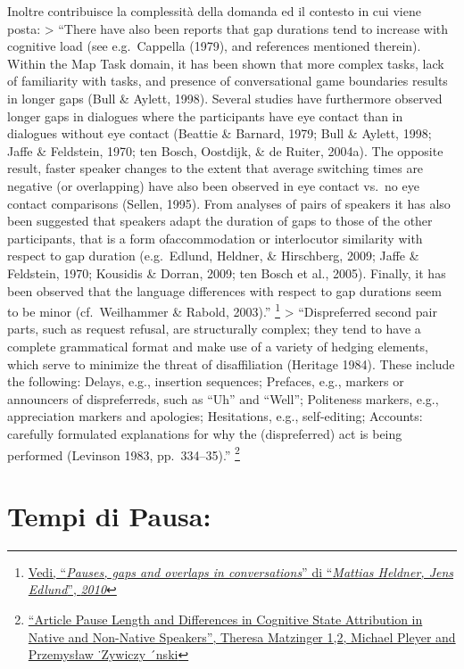 \documentclass[
]{article}
\begin{document}
Inoltre contribuisce la complessità della domanda ed il contesto in cui viene posta: \textgreater{} ``There have also been reports that gap durations tend to increase with cognitive load (see e.g.~Cappella (1979), and references mentioned therein). Within the Map Task domain, it has been shown that more complex tasks, lack of familiarity with tasks, and presence of conversational game boundaries results in longer gaps (Bull \& Aylett, 1998). Several studies have furthermore observed longer gaps in dialogues where the participants have eye contact than in dialogues without eye contact (Beattie \& Barnard, 1979; Bull \& Aylett, 1998; Jaffe \& Feldstein, 1970; ten Bosch, Oostdijk, \& de Ruiter, 2004a). The opposite result, faster speaker changes to the extent that average switching times are negative (or overlapping) have also been observed in eye contact vs.~no eye contact comparisons (Sellen, 1995). From analyses of pairs of speakers it has also been suggested that speakers adapt the duration of gaps to those of the other participants, that is a form ofaccommodation or interlocutor similarity with respect to gap duration (e.g.~Edlund, Heldner, \& Hirschberg, 2009; Jaffe \& Feldstein, 1970; Kousidis \& Dorran, 2009; ten Bosch et al., 2005). Finally, it has been observed that the language differences with respect to gap durations seem to be minor (cf.~Weilhammer \& Rabold, 2003).'' \footnote{\href{DOC/1-s2.0-S0095447010000628-main.pdf}{Vedi, ``\emph{Pauses, gaps and overlaps in conversations}'' di ``\emph{Mattias Heldner, Jens Edlund}'', \emph{2010}}} \textgreater{} ``Dispreferred second pair parts, such as request refusal, are structurally complex; they tend to have a complete grammatical format and make use of a variety of hedging elements, which serve to minimize the threat of disaffiliation (Heritage 1984). These include the following: Delays, e.g., insertion sequences; Prefaces, e.g., markers or announcers of dispreferreds, such as ``Uh'' and ``Well''; Politeness markers, e.g., appreciation markers and apologies; Hesitations, e.g., self-editing; Accounts: carefully formulated explanations for why the (dispreferred) act is being performed (Levinson 1983, pp.~334--35).'' \footnote{\href{\%22DOC/languages-08-00026.pdf}{``Article Pause Length and Differences in Cognitive State Attribution in Native and Non-Native Speakers'', Theresa Matzinger 1,2, Michael Pleyer and Przemysław ˙Zywiczy ´nski}}

\section{Tempi di Pausa:}\label{tempi-di-pausa-1}
\end{document}
